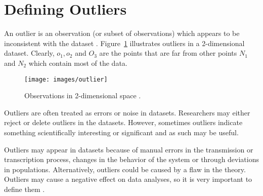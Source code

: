 \section{Defining Outliers}
An outlier is an observation (or subset of observations) which appears to be
inconsistent with the dataset \citep{Barnett}. Figure~\ref{outlier} illustrates outliers in a 2-dimensional dataset. Clearly, $o_1,o_2$ and $O_3$ are the points that are far from other points $N_1$ and $N_2$ which contain most of the data.
\begin{figure}[!h]
\centering 
\texttt{[image: images/outlier]}
\vspace{-4mm}
\caption{Observations in 2-dimensional space \citep{Kurukshetra}.}
\vspace{-2mm}
\label{outlier} 
\end{figure}
\begin{comment}
\begin{figure}[!htb]
\minipage{0.32\textwidth}
  \texttt{[image: images/O1-1]}
  \caption{A really Awesome Image}\label{fig:awesome_image1}
\endminipage\hfill
\minipage{0.32\textwidth}
  \texttt{[image: images/O2]}
  \caption{A really Awesome Image}\label{fig:awesome_image2}
\endminipage\hfill
\minipage{0.32\textwidth}%
  \texttt{[image: images/O3]}
  \caption{A really Awesome Image}\label{fig:awesome_image3}
\endminipage
\end{figure}
\end{comment}

Outliers are often treated as errors or noise in datasets. Researchers may either reject or delete outliers in the datasets. However, sometimes outliers indicate something scientifically interesting or significant and as such may be useful. %

Outliers may appear in datasets because of manual errors in the transmission or transcription process, changes in the behavior of the system or through deviations in populations. Alternatively, outliers could be caused by a flaw in the theory. Outliers may cause a negative effect on data analyses, so it is very important to define them \citep{Outlier}.

